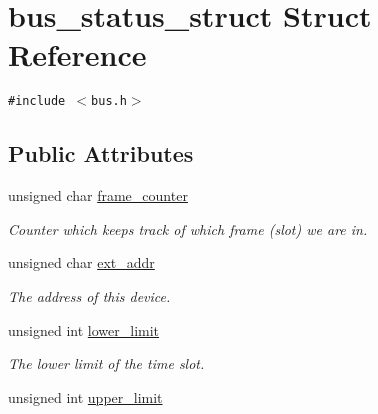 \hypertarget{structbus__status__struct}{
\section{bus\_\-status\_\-struct Struct Reference}
\label{structbus__status__struct}
}
{\tt \#include $<$bus.h$>$}

\subsection*{Public Attributes}
\begin{CompactItemize}
\item 
\hypertarget{structbus__status__struct_9a40dc9828f943c44b95e5b4a176e12d}{
unsigned char \hyperlink{structbus__status__struct_9a40dc9828f943c44b95e5b4a176e12d}{frame\_\-counter}}
\label{structbus__status__struct_9a40dc9828f943c44b95e5b4a176e12d}

\begin{CompactList}\small\item\em Counter which keeps track of which frame (slot) we are in. \item\end{CompactList}\item 
\hypertarget{structbus__status__struct_48f22f9b354b854c7e65976391f238ad}{
unsigned char \hyperlink{structbus__status__struct_48f22f9b354b854c7e65976391f238ad}{ext\_\-addr}}
\label{structbus__status__struct_48f22f9b354b854c7e65976391f238ad}

\begin{CompactList}\small\item\em The address of this device. \item\end{CompactList}\item 
\hypertarget{structbus__status__struct_96e448a81eba4ed327cad6fae3d5a5e7}{
unsigned int \hyperlink{structbus__status__struct_96e448a81eba4ed327cad6fae3d5a5e7}{lower\_\-limit}}
\label{structbus__status__struct_96e448a81eba4ed327cad6fae3d5a5e7}

\begin{CompactList}\small\item\em The lower limit of the time slot. \item\end{CompactList}\item 
\hypertarget{structbus__status__struct_e14f11394e77c7290db105e1728bf546}{
unsigned int \hyperlink{structbus__status__struct_e14f11394e77c7290db105e1728bf546}{upper\_\-limit}}
\label{structbus__status__struct_e14f11394e77c7290db105e1728bf546}


\end{CompactItemize}
